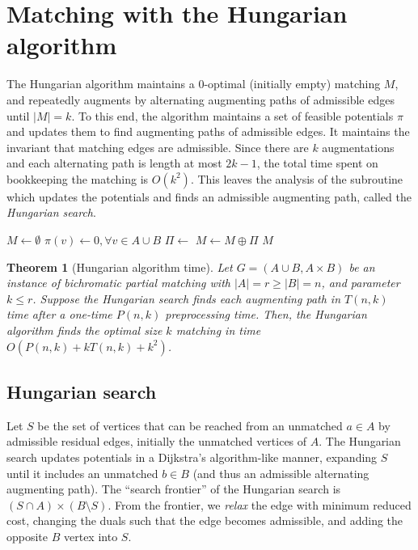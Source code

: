 \documentclass[11pt]{article}
\theoremstyle{plain}
\newtheorem{theorem}{Theorem}
\begin{document}
\section{Matching with the Hungarian algorithm}
\label{section:hung}

The Hungarian algorithm maintains a 0-optimal (initially empty) matching $M$,
and repeatedly augments by alternating augmenting paths of admissible edges
until $|M| = k$.
To this end, the algorithm maintains a set of feasible potentials $\pi$ and
updates them to find augmenting paths of admissible edges.
It maintains the invariant that matching edges are admissible.
Since there are $k$ augmentations and each alternating path is length at most
$2k-1$, the total time spent on bookkeeping the matching is $O(k^2)$.
This leaves the analysis of the subroutine which updates the potentials and
finds an admissible augmenting path, called the \emph{Hungarian search}.

\begin{algorithm}
\caption{Hungarian Algorithm}
\begin{algorithmic}[1]
	\State $M \gets \emptyset$
	\State $\pi(v) \gets 0, \forall v \in A \cup B$
		\State $\Pi \gets$ 
		\State $M \gets M \oplus \Pi$
	\EndWhile
	\State\Return $M$
\EndFunction
\end{algorithmic}
\end{algorithm}

\begin{theorem}[Hungarian algorithm time]
\label{theorem:hung_orig}
	Let $G = (A \cup B, A \times B)$ be an instance of bichromatic partial
	matching with $|A| = r \geq |B| = n$, and parameter $k \leq r$.
	Suppose the Hungarian search finds each augmenting path in $T(n, k)$
	time after a one-time $P(n, k)$ preprocessing time.
	Then, the Hungarian algorithm finds the optimal size $k$ matching in
	time $O(P(n, k) + k T(n, k) + k^2)$.
\end{theorem}

\subsection{Hungarian search}

Let $S$ be the set of vertices that can be reached from an unmatched $a \in A$
by admissible residual edges, initially the unmatched vertices of $A$.
The Hungarian search updates potentials in a Dijkstra's algorithm-like manner,
expanding $S$ until it includes an unmatched $b \in B$ (and thus an admissible
alternating augmenting path).
The ``search frontier'' of the Hungarian search is
$(S \cap A) \times (B \setminus S)$.
From the frontier, we \emph{relax} the edge with minimum reduced cost, changing
the duals such that the edge becomes admissible, and adding the opposite $B$
vertex into $S$.
\end{document}
